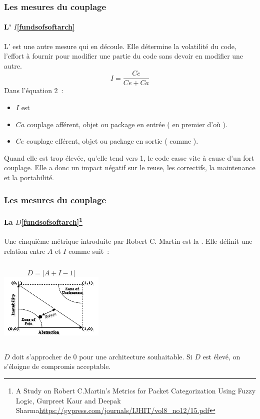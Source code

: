 \documentclass{beamer}
\begin{document}
    \begin{frame}
        \transdissolve
        \frametitle{Les mesures du couplage}
        \framesubtitle{L' $I$\cref{fundsofsoftarch}}
        L' est une autre mesure qui en découle.
        Elle détermine la volatilité du code, l'effort à fournir pour modifier une partie du code sans devoir en modifier une autre.
        \begin{equation}
            I = \frac{Ce}{Ce + Ca}
        \end{equation}
        Dans l'équation 2~:
        \begin{itemize}
            \item $I$ est 
            \item $Ca$ couplage afférent, objet ou package en entrée ( en premier d'où ).
            \item $Ce$ couplage efférent, objet ou package en sortie ( comme ).
        \end{itemize}
        \bigbreak
        Quand elle est trop élevée, qu'elle tend vers 1, le code casse vite à cause d'un fort couplage.
        Elle a donc un impact négatif sur le reuse, les correctifs, la maintenance et la portabilité.
    \end{frame}

    \begin{frame}
        \transdissolve
        \frametitle{Les mesures du couplage}
        \framesubtitle{La $D$\cref{fundsofsoftarch}\footnotestep\footnote{A Study on Robert C.Martin’s Metrics for Packet Categorization
        Using Fuzzy Logic, Gurpreet Kaur and Deepak Sharma\url{https://gvpress.com/journals/IJHIT/vol8_no12/15.pdf}}}
        Une cinquième métrique introduite par Robert C. Martin est la .
        \bigbreak
        Elle définit une relation entre $A$ et $I$ comme suit~:
        \begin{columns}
            \begin{equation}
                D = |A + I - 1|
            \end{equation}
            \centering
            \includegraphics[width=5cm]{image/distance-from-main-sequence}
        \end{columns}
        \flushleft
        $D$ doit s'approcher de 0 pour une architecture souhaitable.
        Si $D$ est élevé, on s'éloigne de compromis acceptable.
    \end{frame}
\end{document}
